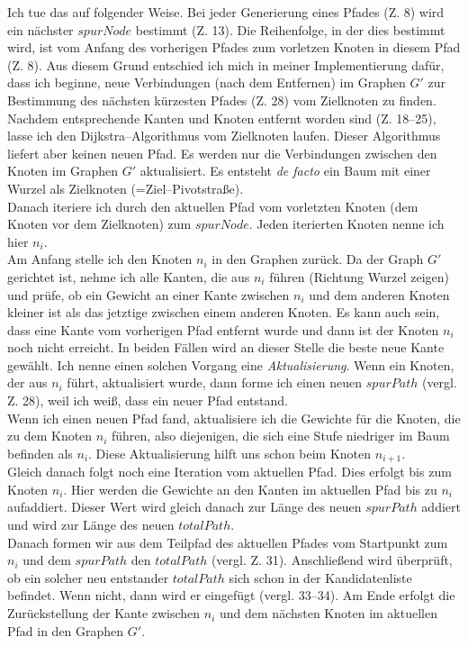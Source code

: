 \documentclass[a4paper,10pt,ngerman]{scrartcl}
\begin{document}
Ich tue das auf folgender Weise.
Bei jeder Generierung eines Pfades (Z. 8) wird ein nächster $spurNode$ bestimmt (Z. 13).
Die Reihenfolge, in der dies bestimmt wird, ist vom Anfang des vorherigen Pfades zum vorletzen Knoten in diesem Pfad (Z. 8).
Aus diesem Grund entschied ich mich in meiner Implementierung dafür, dass ich beginne, neue Verbindungen (nach dem Entfernen)
im Graphen $G'$ zur Bestimmung des nächsten kürzesten Pfades (Z. 28) vom Zielknoten zu finden.\\
Nachdem entsprechende Kanten und Knoten entfernt worden sind (Z. 18--25), lasse ich den Dijkstra--Algorithmus
vom Zielknoten laufen. Dieser Algorithmus liefert aber keinen neuen Pfad. Es werden nur die Verbindungen
zwischen den Knoten im Graphen $G'$ aktualisiert.
Es entsteht \textit{de facto} ein Baum mit einer Wurzel als Zielknoten (=Ziel--Pivotstraße).\\
Danach iteriere ich durch den aktuellen Pfad
vom vorletzten Knoten (dem Knoten vor dem Zielknoten) zum $spurNode$. Jeden iterierten Knoten nenne ich hier $n_i$.\\
Am Anfang stelle ich den Knoten $n_i$ in den Graphen zurück.
Da der Graph $G'$ gerichtet ist, nehme ich alle Kanten, die aus $n_i$ führen (Richtung Wurzel zeigen) und prüfe,
ob ein Gewicht an einer Kante zwischen $n_i$ und dem anderen Knoten kleiner ist als das jetztige
zwischen einem anderen Knoten.
Es kann auch sein, dass eine Kante vom vorherigen Pfad entfernt wurde und dann ist
der Knoten $n_i$ noch nicht erreicht.
In beiden Fällen wird an dieser Stelle die beste neue Kante gewählt. Ich nenne einen solchen Vorgang eine
\textit{Aktualisierung}.
Wenn ein Knoten, der aus $n_i$ führt, aktualisiert wurde, dann forme ich einen neuen $spurPath$ (vergl. Z. 28),
weil ich weiß, dass ein neuer Pfad entstand.\\
Wenn ich einen neuen Pfad fand, aktualisiere ich die Gewichte für die Knoten, die zu dem Knoten
$n_i$ führen, also diejenigen, die sich eine Stufe niedriger im Baum befinden als $n_i$.
Diese Aktualisierung hilft uns schon beim Knoten $n_{i+1}$.\\
Gleich danach folgt noch eine Iteration vom aktuellen Pfad. Dies erfolgt bis zum Knoten $n_i$.
Hier werden die Gewichte an den Kanten im aktuellen Pfad bis zu $n_i$ aufaddiert.
Dieser Wert wird gleich danach zur Länge des neuen $spurPath$ addiert und wird
zur Länge des neuen $totalPath$.\\
Danach formen wir aus dem Teilpfad des aktuellen Pfades vom Startpunkt zum $n_i$ und dem $spurPath$ den $totalPath$ (vergl. Z. 31). 
Anschließend wird überprüft, ob ein solcher neu entstander $totalPath$ sich schon in der Kandidatenliste befindet.
Wenn nicht, dann wird er eingefügt (vergl. 33--34). Am Ende erfolgt die Zurückstellung der Kante zwischen
$n_i$ und dem nächsten Knoten im aktuellen Pfad in den Graphen $G'$.\\
\end{document}
